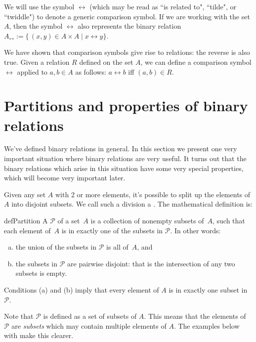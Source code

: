 We will use the symbol $\rel$ (which may be read as ``is related to", ``tilde", or ``twiddle") to denote a generic comparison symbol. If we are working with the set $A$, then the symbol $\rel$ also represents the binary relation $A_\rel := \{\, (x,y) \in A \times A \mid x \rel y \}$.

We have shown that comparison symbols give rise to relations: the reverse is also true. Given a relation $R$ defined on the set $A$, we can define a comparison symbol $\rel$ applied to $a,b \in A$ as follows:
$ a \rel b$ iff $(a,b) \in R$.

\section{Partitions and properties of binary relations  \quad{}} 
\label{sec:EquivalenceRelations:PartitionsAndProperties}

We've defined binary relations in general. In this section we present one very important situation where binary relations are very useful. It turns out that the binary relations which arise in this situation have some very special properties, which will become very important later.

Given any set $A$ with 2 or more elements, it's possible to split up the elements of $A$ into disjoint subsets. We call such a division a . The mathematical definition is:

\begin{defn}{defPartition} A  $\mathcal{P}$ of a set~$A$ is a collection of nonempty subsets of~$A$, such that each element of~$A$ is in exactly one of the subsets in $\mathcal{P}$. In other words:
\begin{enumerate}[(a)]
\item the union of the subsets in $\mathcal{P}$ is all of~$A$,
and
\item the subsets in $\mathcal{P}$ are pairwise disjoint: that is the intersection of any two subsets is empty.
\end{enumerate}
Conditions (a) and (b) imply that every element of $A$ is in exactly one subset in $\mathcal{P}$.
\end{defn}

\begin{rem}
Note that $\mathcal{P}$ is defined as a set of subsets of $A$. This means that the elements of $\mathcal{P}$ are \emph{subsets} which may contain multiple elements of $A$. The examples below with make this clearer.
\end{rem}

